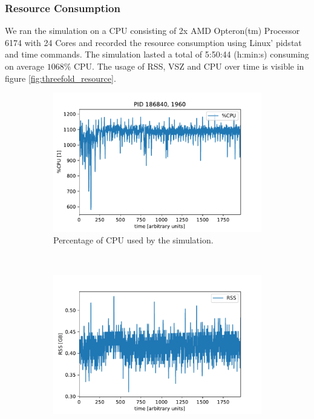 \documentclass{article}
\begin{document}
\subsubsection{Resource Consumption}
We ran the simulation on a CPU consisting of 2x AMD Opteron(tm) Processor 6174 with 24 Cores and recorded the resource consumption using Linux' pidstat and time commands. The simulation lasted a total of 5:50:44 (h:min:s) consuming on average $1068 \%$ CPU. The usage of RSS, VSZ and CPU over time is visible in figure \ref{fig:threefold_resource}.
\begin{figure}[H]
  \begin{subfigure}[b]{0.5 \textwidth}
    \includegraphics[width = \textwidth]{graphics/threefold_morse/threefold_perCPU.pdf}
    \caption{Percentage of CPU used by the simulation.}
  \end{subfigure}
  ~
  \begin{subfigure}[b]{0.5 \textwidth}
    \includegraphics[width = \textwidth]{graphics/threefold_morse/threefold_RSS.pdf}

\end{subfigure}
\end{figure}
\end{document}
